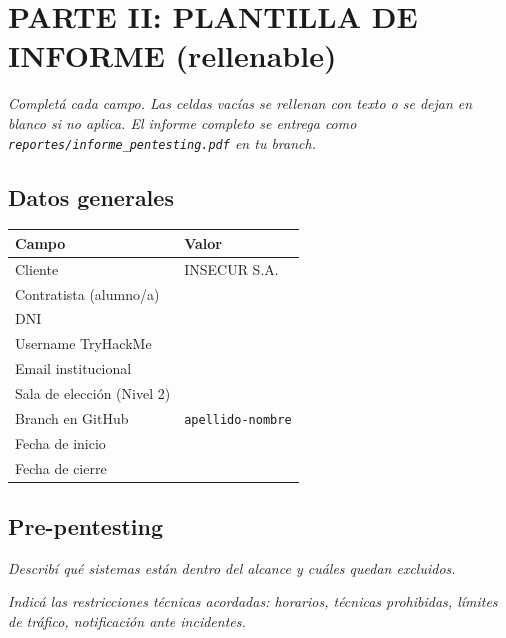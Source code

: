 \documentclass[11pt,a4paper]{article}
\begin{document}
\section{PARTE II: PLANTILLA DE INFORME (rellenable)}

\textit{Completá cada campo. Las celdas vacías se rellenan con texto o se dejan en blanco si no aplica. El informe completo se entrega como \texttt{reportes/informe\_pentesting.pdf} en tu branch.}

\subsection{Datos generales}

\begin{center}
\renewcommand{\arraystretch}{1.6}
\begin{tabularx}{\textwidth}{@{} p{5cm} X @{}}
\toprule
\textbf{Campo} & \textbf{Valor} \\
\midrule
Cliente & INSECUR S.A. \\
Contratista (alumno/a) & \dotfill \\
DNI & \dotfill \\
Username TryHackMe & \dotfill \\
Email institucional & \dotfill \\
Sala de elección (Nivel 2) & \dotfill \\
Branch en GitHub & \texttt{apellido-nombre} \\
Fecha de inicio & \dotfill \\
Fecha de cierre & \dotfill \\
\bottomrule
\end{tabularx}
\end{center}

\subsection{Pre-pentesting}\label{sec:pre}

\begin{campo}
\textit{Describí qué sistemas están dentro del alcance y cuáles quedan excluidos.}
\vspace{2cm}
\end{campo}

\begin{campo}
\textit{Indicá las restricciones técnicas acordadas: horarios, técnicas prohibidas, límites de tráfico, notificación ante incidentes.}
\vspace{2cm}
\end{campo}
\end{document}

